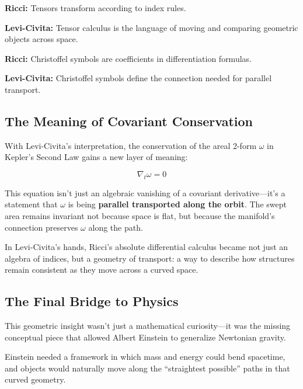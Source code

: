 \begin{tcolorbox}[colback=gray!5!white, colframe=black, title=\textbf{Sidebar: Levi-Civita’s Geometric Leap}, fonttitle=\bfseries, arc=1.5mm, boxrule=0.4pt]

\textbf{Ricci:} Tensors transform according to index rules.

\textbf{Levi-Civita:} Tensor calculus is the language of moving and comparing geometric objects across space.

\medskip

\textbf{Ricci:} Christoffel symbols are coefficients in differentiation formulas.

\textbf{Levi-Civita:} Christoffel symbols define the connection needed for parallel transport.

\end{tcolorbox}

\bigskip

\subsection*{The Meaning of Covariant Conservation}

With Levi-Civita’s interpretation, the conservation of the areal 2-form \( \omega \) in Kepler’s Second Law gains a new layer of meaning:

\[
\nabla_t \omega = 0
\]

This equation isn’t just an algebraic vanishing of a covariant derivative—it’s a statement that \( \omega \) is being \textbf{parallel transported along the orbit}.  
The swept area remains invariant not because space is flat, but because the manifold’s connection preserves \( \omega \) along the path.

In Levi-Civita’s hands, Ricci’s absolute differential calculus became not just an algebra of indices, but a geometry of transport: a way to describe how structures remain consistent as they move across a curved space.

\bigskip

\subsection*{The Final Bridge to Physics}

This geometric insight wasn’t just a mathematical curiosity—it was the missing conceptual piece that allowed Albert Einstein to generalize Newtonian gravity.

Einstein needed a framework in which mass and energy could bend spacetime, and objects would naturally move along the “straightest possible” paths in that curved geometry.

